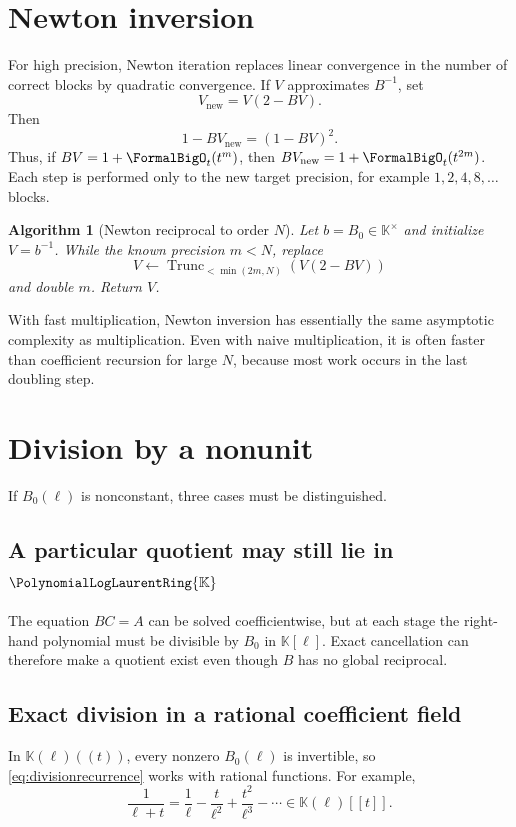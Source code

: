 \documentclass[11pt,oneside,openany]{book}
\newtheorem{algorithm}[theorem]{Algorithm}
\newcommand{\K}{\mathbb{K}}
\newcommand{\Pring}{\PolynomialLogLaurentRing{\K}}
\newcommand{\TransseriesTruncateBelow}[2]{%
  \operatorname{Trunc}_{<#2}\!\left(#1\right)%
}
\begin{document}
\section{Newton inversion}
For high precision, Newton iteration replaces linear convergence in the number
of correct blocks by quadratic convergence.  If \(V\) approximates \(B^{-1}\),
set
\begin{equation}\label{eq:newtonreciprocal}
  V_{\mathrm{new}}=V(2-BV).
\end{equation}
Then
\begin{equation}\label{eq:newtonreciprocalerror}
  1-BV_{\mathrm{new}}=(1-BV)^2.
\end{equation}
Thus, if \(BV=1+\FormalBigO_t(t^m)\), then
\(BV_{\mathrm{new}}=1+\FormalBigO_t(t^{2m})\).  Each step is performed only to the
new target precision, for example \(1,2,4,8,\ldots\) blocks.

\begin{algorithm}[Newton reciprocal to order \(N\)]
Let \(b=B_0\in\K^\times\) and initialize \(V=b^{-1}\).  While the known
precision \(m<N\), replace
\[
 V\leftarrow\TransseriesTruncateBelow{V(2-BV)}{\min(2m,N)}
\]
and double \(m\).  Return \(V\).
\end{algorithm}

With fast multiplication, Newton inversion has essentially the same asymptotic
complexity as multiplication.  Even with naive multiplication, it is often
faster than coefficient recursion for large \(N\), because most work occurs in
the last doubling step.

\section{Division by a nonunit}
If \(B_0(\ell)\) is nonconstant, three cases must be distinguished.

\subsection{A particular quotient may still lie in \texorpdfstring{\(\Pring\)}{P}}
The equation \(BC=A\) can be solved coefficientwise, but at each stage the
right-hand polynomial must be divisible by \(B_0\) in \(\K[\ell]\).  Exact
cancellation can therefore make a quotient exist even though \(B\) has no
global reciprocal.

\subsection{Exact division in a rational coefficient field}
In \(\K(\ell)((t))\), every nonzero \(B_0(\ell)\) is invertible, so
\cref{eq:divisionrecurrence} works with rational functions.  For example,
\begin{equation}\label{eq:ellplusreciprat}
 \frac{1}{\ell+t}
 =\frac1\ell-\frac{t}{\ell^2}+\frac{t^2}{\ell^3}-\cdots
 \in\K(\ell)[[t]].
\end{equation}
\end{document}
